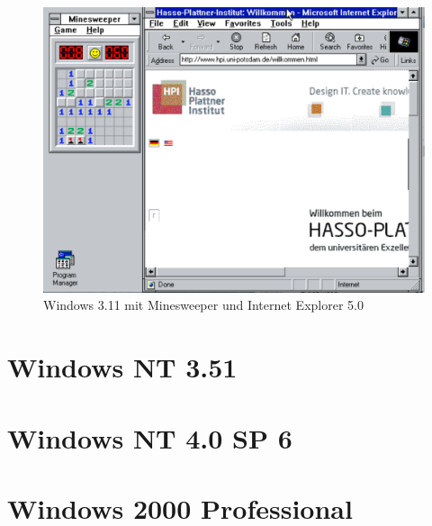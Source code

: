 	\begin{figure}[h]
		\begin{center}
			\includegraphics[width=\textwidth]{img/win311screen}
			\caption{Windows 3.11 mit Minesweeper und Internet Explorer 5.0}
			\label{fig:screenshot-win311apps}
		\end{center}
	\end{figure}

\newpage
\section{Windows NT 3.51}


\section{Windows NT 4.0 SP 6}


\section{Windows 2000 Professional}
